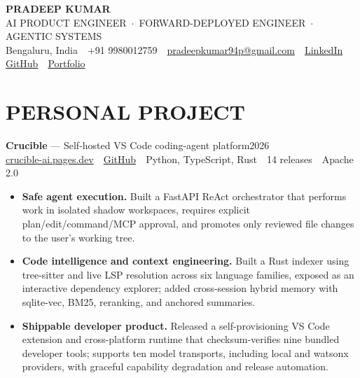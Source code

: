 \documentclass[letterpaper,10pt]{article}
\newcommand{\project}[4]{%
  {\color{accent}\bfseries #1} — #2\hfill{\color{muted}\small #3}\\[1pt]
  {\small\color{muted} #4}\vspace{3pt}
}
\newcommand{\focus}[1]{\textbf{\color{accent}#1}}
\begin{document}
\begin{center}
{\fontsize{22}{24}\selectfont\bfseries\color{accent} PRADEEP KUMAR}\\[3pt]
{\color{accent}\small AI PRODUCT ENGINEER \,$\cdot$\, FORWARD-DEPLOYED ENGINEER \,$\cdot$\, AGENTIC SYSTEMS}\\[6pt]
{\footnotesize\color{muted}
Bengaluru, India \,\textbar\, +91 9980012759 \,\textbar\,
\href{mailto:pradeepkumar94p@gmail.com}{pradeepkumar94p@gmail.com} \,\textbar\,
\href{https://www.linkedin.com/in/pradeepk21}{LinkedIn} \,\textbar\,
\href{https://github.com/pradeepA2125}{GitHub} \,\textbar\,
\href{https://pradeepa2125.github.io/pradeep-site/}{Portfolio}}
\end{center}
\section*{PERSONAL PROJECT}

\project{Crucible}{Self-hosted VS Code coding-agent platform}{2026}
{\href{https://crucible-ai.pages.dev}{crucible-ai.pages.dev} \,\textbar\,
\href{https://github.com/pradeepA2125/crucible}{GitHub} \,\textbar\,
Python, TypeScript, Rust \,\textbar\, 14 releases \,\textbar\, Apache 2.0}
\begin{itemize}[itemsep=7pt]
  \item \focus{Safe agent execution.} Built a FastAPI ReAct orchestrator that performs work in isolated shadow
        workspaces, requires explicit plan/edit/command/MCP approval, and promotes only reviewed file changes
        to the user's working tree.
  \item \focus{Code intelligence and context engineering.} Built a Rust indexer using tree-sitter and live LSP
        resolution across six language families, exposed as an interactive dependency explorer; added
        cross-session hybrid memory with sqlite-vec, BM25, reranking, and anchored summaries.
  \item \focus{Shippable developer product.} Released a self-provisioning VS Code extension and cross-platform
        runtime that checksum-verifies nine bundled developer tools; supports ten model transports, including
        local and watsonx providers, with graceful capability degradation and release automation.
\end{itemize}

\end{document}
